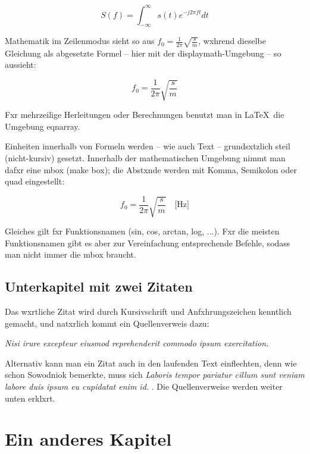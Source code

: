 \begin{equation}\label{gl_fourier}
S(f) = \int_{-\infty}^{\infty} s(t)e^{-j 2 \pi f t}dt
\end{equation}

Mathematik im Zeilenmodus sieht so aus $f_0 = \frac{1}{2\pi} \sqrt{\frac{s}{m}}$, wxhrend dieselbe Gleichung als abgesetzte Formel -- hier mit der displaymath-Umgebung -- so aussieht: 

\begin{displaymath}
f_0 = \frac{1}{2\pi} \sqrt{\frac{s}{m}} 
\end{displaymath}

Fxr mehrzeilige Herleitungen oder Berechnungen benutzt man in \LaTeX\ die Umgebung eqnarray.

Einheiten innerhalb von Formeln werden -- wie auch Text -- grundsxtzlich steil (nicht-kursiv) gesetzt. Innerhalb der mathematischen Umgebung nimmt man dafxr eine mbox (make box); die Abstxnde werden mit Komma, Semikolon oder quad eingestellt:

\begin{displaymath}
f_0 = \frac{1}{2\pi} \sqrt{\frac{s}{m}} \quad \mbox{[Hz]}
\end{displaymath}

Gleiches gilt fxr Funktionsnamen (sin, cos, arctan, log, ...). Fxr die meisten Funktionsnamen gibt es aber zur Vereinfachung entsprechende Befehle, sodass man nicht immer die mbox braucht.


\section{Unterkapitel mit zwei Zitaten}

Das wxrtliche Zitat wird durch Kursivschrift und Anfxhrungszeichen kenntlich gemacht, und natxrlich kommt ein Quellenverweis dazu:

\medskip
\emph{Nisi irure excepteur eiusmod reprehenderit commodo ipsum exercitation.} \cite{sowodniok}
\medskip

Alternativ kann man ein Zitat auch in den laufenden Text einflechten, denn wie schon Sowodniok bemerkte, muss sich 
\emph{Laboris tempor pariatur cillum sunt veniam labore duis ipsum eu cupidatat enim id.} \citep[111]{sowodniok}. 
Die Quellenverweise werden weiter unten erklxrt.


\chapter{Ein anderes Kapitel}

